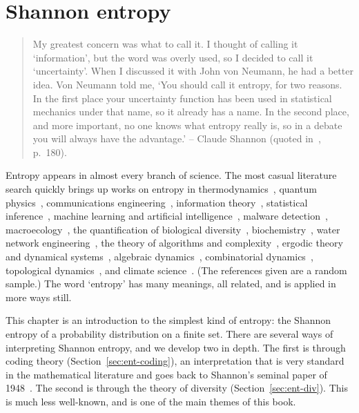 \chapter{Shannon entropy}

\begin{quote}
My greatest concern was what to call it. I thought of calling it
`information', but the word was overly used, so I decided to call it
`uncertainty'.  When I discussed it with John von Neumann, he had a better
idea.  Von Neumann told me, `You should call it entropy, for two
reasons. In the first place your uncertainty function has been used in
statistical mechanics under that name, so it already has a name.  In the
second place, and more important, no one knows what entropy really is, so
in a debate you will always have the advantage.'  
\hfill 
-- Claude Shannon%
%
%
%
(quoted in~\cite{TrMc}, p.~180).
\end{quote}

Entropy appears in almost every branch of science.  The most casual
literature search quickly brings up works on entropy in
thermodynamics~\cite{Ferm}, quantum physics~\cite{PST}, communications
engineering~\cite{ShanMTC,SCBE}, information theory~\cite{MacKITI},
statistical inference~\cite{JaynWDWS,JaynPTL}, machine learning and
artificial intelligence~\cite{BoKoPe,Deng,Ratn}, malware
detection~\cite{BJS}, macroecology~\cite{Hart}, the quantification of
biological diversity~\cite{Magu}, biochemistry~\cite{MDV}, water network
engineering~\cite{GDS}, the theory of algorithms and
complexity~\cite{Gacs}, ergodic theory and dynamical
systems~\cite{Parr,Down}, algebraic dynamics~\cite{EvWa}, combinatorial
dynamics~\cite{ALM}, topological dynamics~\cite{AKM}, and climate
science~\cite{HaTe}.  (The references given are a random sample.)  The word
`entropy' has many meanings, all related, and is applied in more ways
still.

This chapter is an introduction to the simplest kind of entropy: the
Shannon entropy of a probability distribution on a finite set.  There are
several ways of interpreting Shannon entropy, and we develop two in depth.
The first is through coding theory (Section~\ref{sec:ent-coding}), an
interpretation that is very standard in the mathematical literature and
goes back to Shannon's seminal paper of 1948~\cite{ShanMTC}.  The second is
through the theory of diversity (Section~\ref{sec:ent-div}).  This is
much less well-known, and is one of the main themes of this book.

